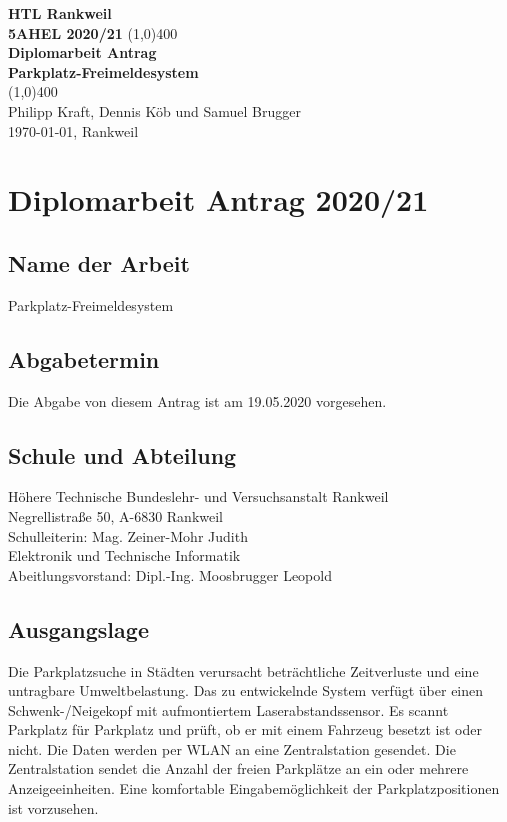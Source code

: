 \documentclass[11pt]{article}
\begin{document}
\begin{titlepage}
  \begin{center}
    \vspace*{1cm}
    \large{\textbf{HTL Rankweil}}\\
    \large{\textbf{5AHEL 2020/21}}
    \vfill
    \line(1,0){400}\\[1mm]
    \huge{\textbf{Diplomarbeit Antrag}}\\[3mm]
    \large{\textbf{Parkplatz-Freimeldesystem}}\\[1mm]
    \line(1,0){400}\\
    \vfill
    Philipp Kraft, Dennis Köb und Samuel Brugger\\[3mm]
    \today, Rankweil
  \end{center}
\end{titlepage}

\tableofcontents
\thispagestyle{empty}
\clearpage

\setcounter{page}{1}
\section{Diplomarbeit Antrag 2020/21}

\subsection{Name der Arbeit}
Parkplatz-Freimeldesystem

\subsection{Abgabetermin}
Die Abgabe von diesem Antrag ist am 19.05.2020 vorgesehen.

\subsection{Schule und Abteilung}
Höhere Technische Bundeslehr- und Versuchsanstalt Rankweil\\
Negrellistraße 50, A-6830 Rankweil\\
Schulleiterin: Mag. Zeiner-Mohr Judith\\

Elektronik und Technische Informatik\\
Abeitlungsvorstand: Dipl.-Ing. Moosbrugger Leopold

\subsection{Ausgangslage}
Die Parkplatzsuche in Städten verursacht beträchtliche Zeitverluste und eine untragbare Umweltbelastung. Das zu entwickelnde System verfügt über einen Schwenk-/Neigekopf mit aufmontiertem Laserabstandssensor. Es scannt Parkplatz für Parkplatz und prüft, ob er mit einem Fahrzeug besetzt ist oder nicht. Die Daten werden per WLAN an eine Zentralstation gesendet. Die Zentralstation sendet die Anzahl der freien Parkplätze an ein oder mehrere Anzeigeeinheiten. Eine komfortable Eingabemöglichkeit der Parkplatzpositionen ist vorzusehen.
\end{document}
